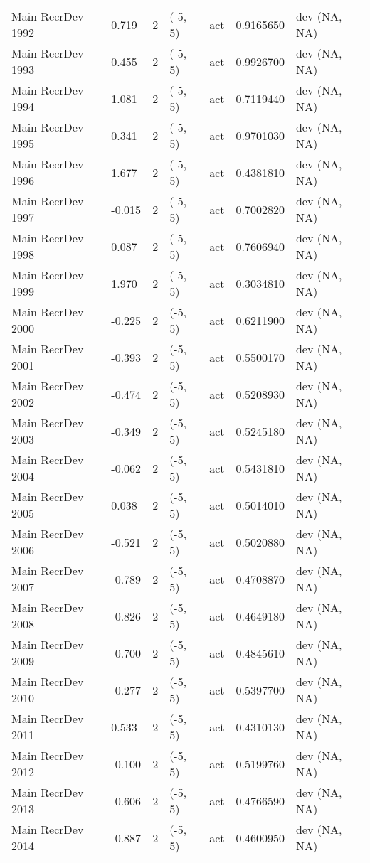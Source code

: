 \documentclass[11pt,
  english,
  a4paper,
]{article}
\begin{document}
\begin{landscape}
\begin{longtable}[t]{>{\raggedright\arraybackslash}p{6cm}lllll>{\raggedright\arraybackslash}p{4cm}}
Main RecrDev 1992 & 0.719 & 2 & (-5, 5) & act & 0.9165650 & dev (NA, NA)\\
Main RecrDev 1993 & 0.455 & 2 & (-5, 5) & act & 0.9926700 & dev (NA, NA)\\
Main RecrDev 1994 & 1.081 & 2 & (-5, 5) & act & 0.7119440 & dev (NA, NA)\\
Main RecrDev 1995 & 0.341 & 2 & (-5, 5) & act & 0.9701030 & dev (NA, NA)\\
Main RecrDev 1996 & 1.677 & 2 & (-5, 5) & act & 0.4381810 & dev (NA, NA)\\
Main RecrDev 1997 & -0.015 & 2 & (-5, 5) & act & 0.7002820 & dev (NA, NA)\\
Main RecrDev 1998 & 0.087 & 2 & (-5, 5) & act & 0.7606940 & dev (NA, NA)\\
Main RecrDev 1999 & 1.970 & 2 & (-5, 5) & act & 0.3034810 & dev (NA, NA)\\
Main RecrDev 2000 & -0.225 & 2 & (-5, 5) & act & 0.6211900 & dev (NA, NA)\\
Main RecrDev 2001 & -0.393 & 2 & (-5, 5) & act & 0.5500170 & dev (NA, NA)\\
Main RecrDev 2002 & -0.474 & 2 & (-5, 5) & act & 0.5208930 & dev (NA, NA)\\
Main RecrDev 2003 & -0.349 & 2 & (-5, 5) & act & 0.5245180 & dev (NA, NA)\\
Main RecrDev 2004 & -0.062 & 2 & (-5, 5) & act & 0.5431810 & dev (NA, NA)\\
Main RecrDev 2005 & 0.038 & 2 & (-5, 5) & act & 0.5014010 & dev (NA, NA)\\
Main RecrDev 2006 & -0.521 & 2 & (-5, 5) & act & 0.5020880 & dev (NA, NA)\\
Main RecrDev 2007 & -0.789 & 2 & (-5, 5) & act & 0.4708870 & dev (NA, NA)\\
Main RecrDev 2008 & -0.826 & 2 & (-5, 5) & act & 0.4649180 & dev (NA, NA)\\
Main RecrDev 2009 & -0.700 & 2 & (-5, 5) & act & 0.4845610 & dev (NA, NA)\\
Main RecrDev 2010 & -0.277 & 2 & (-5, 5) & act & 0.5397700 & dev (NA, NA)\\
Main RecrDev 2011 & 0.533 & 2 & (-5, 5) & act & 0.4310130 & dev (NA, NA)\\
Main RecrDev 2012 & -0.100 & 2 & (-5, 5) & act & 0.5199760 & dev (NA, NA)\\
Main RecrDev 2013 & -0.606 & 2 & (-5, 5) & act & 0.4766590 & dev (NA, NA)\\
Main RecrDev 2014 & -0.887 & 2 & (-5, 5) & act & 0.4600950 & dev (NA, NA)\\

\end{longtable}
\end{landscape}
\end{document}
